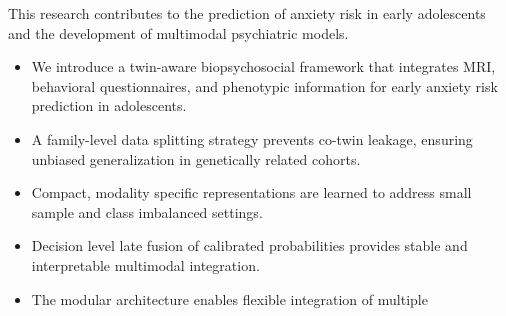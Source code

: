 \documentclass[10pt,letterpaper]{article}
\begin{document}
                                                                                                                          This research contributes to the prediction of anxiety risk in early
                                                                                                                          adolescents and the development of multimodal psychiatric models.

                                                                                                                          \begin{itemize}
                                                                                                                              \item We introduce a twin-aware biopsychosocial framework that integrates
                                                                                                                                  MRI, behavioral questionnaires, and phenotypic information for early
                                                                                                                                      anxiety risk prediction in adolescents.
                                                                                                                                          \item A family-level data splitting strategy prevents co-twin leakage,
                                                                                                                                              ensuring unbiased generalization in genetically related cohorts.
                                                                                                                                                  \item Compact, modality specific representations are learned to address
                                                                                                                                                      small sample and class imbalanced settings.
                                                                                                                                                          \item Decision level late fusion of calibrated probabilities provides
                                                                                                                                                              stable and interpretable multimodal integration.
                                                                                                                                                                  \item The modular architecture enables flexible integration of multiple

\end{itemize}
\end{document}
